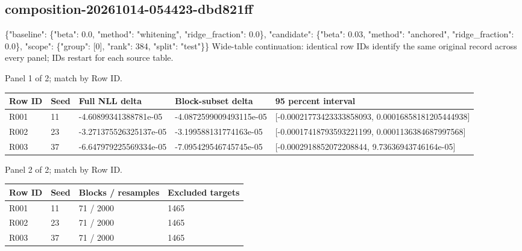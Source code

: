 \documentclass[10pt]{article}
\begin{document}
\subsection{composition-20261014-054423-dbd821ff}
\{"baseline": \{"beta": 0.0, "method": "whitening", "ridge\_fraction": 0.0\}, "candidate": \{"beta": 0.03, "method": "anchored", "ridge\_fraction": 0.0\}, "scope": \{"group": [0], "rank": 384, "split": "test"\}\}
Wide-table continuation: identical row IDs identify the same original record across every panel; IDs restart for each source table.
\par\noindent Panel 1 of 2; match by Row ID.
{\scriptsize\setlength{\tabcolsep}{2pt}
\begin{longtable}{p{}p{}p{}p{}p{}}
Row ID & Seed & Full NLL delta & Block-subset delta & 95 percent interval \\
\hline\endhead
R001 & 11 & -4.60899341388781e-05 & -4.0872599009493115e-05 & [-0.00021773423333858093, 0.00016858181205444938] \\
R002 & 23 & -3.271375526325137e-05 & -3.199588131774163e-05 & [-0.00017418793593221199, 0.0001136384687997568] \\
R003 & 37 & -6.647979225569334e-05 & -7.095429546745745e-05 & [-0.0002918852072208844, 9.73636943746164e-05] \\
\end{longtable}}
\par\noindent Panel 2 of 2; match by Row ID.
{\scriptsize\setlength{\tabcolsep}{2pt}
\begin{longtable}{p{}p{}p{}p{}}
Row ID & Seed & Blocks / resamples & Excluded targets \\
\hline\endhead
R001 & 11 & 71 / 2000 & 1465 \\
R002 & 23 & 71 / 2000 & 1465 \\
R003 & 37 & 71 / 2000 & 1465 \\
\end{longtable}}
\end{document}
